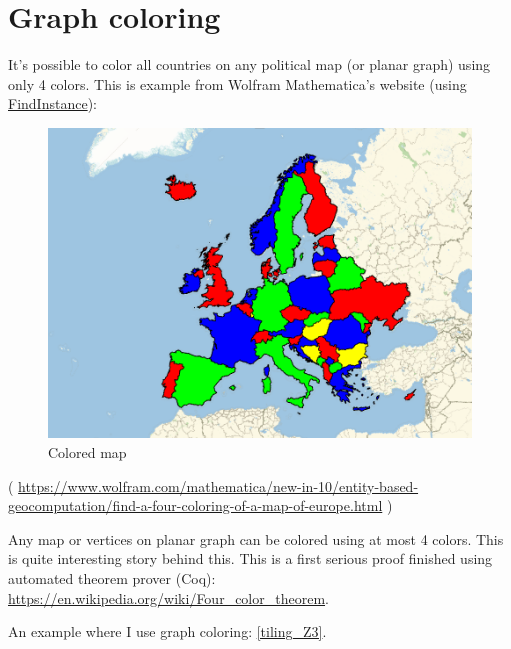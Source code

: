 \section{Graph coloring}

It's possible to color all countries on any political map (or planar graph) using only 4 colors.
This is example from Wolfram Mathematica's website
(using \href{http://reference.wolfram.com/language/ref/FindInstance.html}{FindInstance}):

\begin{figure}[H]
\label{fig:pipe_shuffled}
\centering
\includegraphics[scale=0.75]{color/map.png}
\caption{Colored map}
\end{figure}

( \url{https://www.wolfram.com/mathematica/new-in-10/entity-based-geocomputation/find-a-four-coloring-of-a-map-of-europe.html} )

Any map or vertices on planar graph can be colored using at most 4 colors.
This is quite interesting story behind this.
This is a first serious proof finished using automated theorem prover (Coq):
\url{https://en.wikipedia.org/wiki/Four_color_theorem}.

An example where I use graph coloring: \ref{tiling_Z3}.




